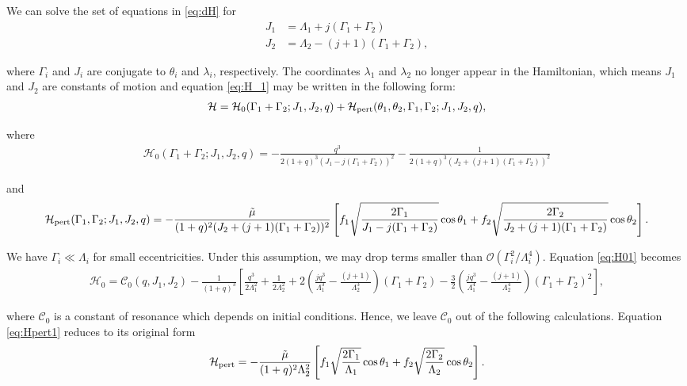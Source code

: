 \documentclass[usenatbib,twocolumn]{mnras}
\begin{document}
\noindent
We can solve the set of equations in \eqref{eq:dH} for
\begin{align}
\label{eq:J1}
J_1 &= \Lambda_1 + j(\Gamma_1+\Gamma_2)\\
\label{eq:J2}
J_2 &= \Lambda_2 - (j+1)(\Gamma_1+\Gamma_2),
\end{align}

\noindent where \(\Gamma_i\) and \(J_i\) are conjugate to
\(\theta_i\) and \(\lambda_i\), respectively.
The coordinates \(\lambda_1\) and \(\lambda_2\)
no longer appear in the Hamiltonian,
which means \(J_1\) and \(J_2\) are constants of motion and
equation \eqref{eq:H_1} may be written
in the following form:
\begin{align}
\label{eq:H_2}
  \mathcal{H}
  = \mathcal{H}_0(\Gamma_1+\Gamma_2; J_1, J_2, q)
                  + \mathcal{H}_{\rm pert}(\theta_1, \theta_2, \Gamma_1,\Gamma_2; J_1, J_2, q),
\end{align}

\noindent
where
\begin{align}
  \label{eq:H01}
  \mathcal{H}_0(\Gamma_1+\Gamma_2; J_1, J_2, q)
  = -\frac{q^3}{2(1+q)^3(J_1-j(\Gamma_1+\Gamma_2))^2}
  -\frac{1}{2(1+q)^3(J_2+(j+1)(\Gamma_1+\Gamma_2))^2} 
\end{align}

\noindent
and
\begin{align}
  \label{eq:Hpert1}
  \mathcal{H}_{\rm pert}(\Gamma_1,\Gamma_2; J_1, J_2, q)
  = -\frac{\tilde\mu}{(1+q)^2(J_2+(j+1)(\Gamma_1+\Gamma_2))^2}
  \left[
    f_1\sqrt{\frac{2\Gamma_1}{J_1 - j(\Gamma_1+\Gamma_2)}}\cos\theta_1
  +f_2\sqrt{\frac{2\Gamma_2}{J_2 + (j+1)(\Gamma_1+\Gamma_2)}}\cos\theta_2
    \right].
\end{align}

\noindent We have \(\Gamma_i \ll \Lambda_i\) for small
eccentricities.  Under this assumption, we may drop terms smaller than
\(\mathcal{O}(\Gamma_i^2/\Lambda_i^4)\).  Equation \eqref{eq:H01} becomes
\begin{align}
  \label{eq:H02}
  \mathcal{H}_0
  = \mathcal C_0(q, J_1, J_2) -\frac{1}{(1+q)^3}\left[
     \frac{q^3}{2\Lambda_1^2} + \frac{1}{2\Lambda_2^2}
   + 2\left(
     \frac{jq^3}{\Lambda_1^3} - \frac{(j+1)}{\Lambda_2^3}
     \right)(\Gamma_1+\Gamma_2)
   -\frac32\left( 
     \frac{jq^3}{\Lambda_1^4} - \frac{(j+1)}{\Lambda_2^4}\right)
     (\Gamma_1+\Gamma_2)^2
     \right],
\end{align}

\noindent
where \(\mathcal C_0\) is a constant of resonance which depends on initial conditions.
Hence, we leave \(\mathcal C_0\) out of the following calculations.
Equation \eqref{eq:Hpert1} reduces to its original form
\begin{align}
\label{eq:H_3}
  \mathcal{H}_{\rm pert}
  =-\frac{\tilde\mu}{(1+q)^2\Lambda_2^2}
  \left[
  f_1\sqrt{\frac{2\Gamma_1}{\Lambda_1}}\cos\theta_1
  +f_2\sqrt{\frac{2\Gamma_2}{\Lambda_2}}\cos\theta_2
  \right].
\end{align}
\end{document}
